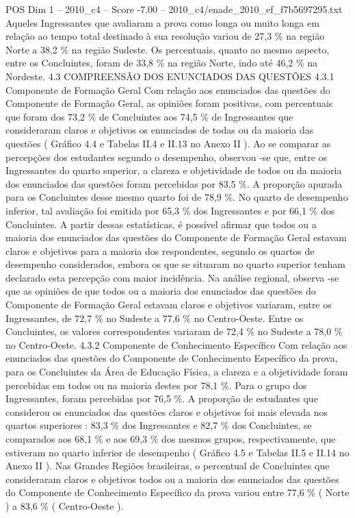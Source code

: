 \begin{textsample}{POS Dim 1 – 2010\_c4 – Score -7.00 – 2010\_c4/enade\_2010\_ef\_f7b5697295.txt}
Aqueles Ingressantes que avaliaram a prova como longa ou muito longa em relação ao tempo total destinado à sua resolução variou de 27,3 \% na região Norte a 38,2 \% na região Sudeste.
Os percentuais, quanto ao mesmo aspecto, entre os Concluintes, foram de 33,8 \% na região Norte, indo até 46,2 \% na Nordeste. 4.3 COMPREENSÃO DOS ENUNCIADOS DAS QUESTÕES 4.3.1 Componente de Formação Geral Com relação aos enunciados das questões do Componente de Formação Geral, as opiniões foram positivas, com percentuais que foram dos 73,2 \% de Concluintes aos 74,5 \% de Ingressantes que consideraram claros e objetivos os enunciados de todas ou da maioria das questões ( Gráfico 4.4 e Tabelas II.4 e II.13 no Anexo II ).
Ao se comparar as percepções dos estudantes segundo o desempenho, observou -se que, entre os Ingressantes do quarto superior, a clareza e objetividade de todos ou da maioria dos enunciados das questões foram percebidas por 83,5 \%.
A proporção apurada para os Concluintes desse mesmo quarto foi de 78,9 \%.
No quarto de desempenho inferior, tal avaliação foi emitida por 65,3 \% dos Ingressantes e por 66,1 \% dos Concluintes.
A partir dessas estatísticas, é possível afirmar que todos ou a maioria dos enunciados das questões do Componente de Formação Geral estavam claros e objetivos para a maioria dos respondentes, segundo os quartos de desempenho considerados, embora os que se situaram no quarto superior tenham declarado esta percepção com maior incidência.
Na análise regional, observa -se que as opiniões de que todos ou a maioria dos enunciados das questões do Componente de Formação Geral estavam claros e objetivos variaram, entre os Ingressantes, de 72,7 \% no Sudeste a 77,6 \% no Centro-Oeste.
Entre os Concluintes, os valores correspondentes variaram de 72,4 \% no Sudeste a 78,0 \% no Centro-Oeste. 4.3.2 Componente de Conhecimento Específico Com relação aos enunciados das questões do Componente de Conhecimento Específico da prova, para os Concluintes da Área de Educação Física, a clareza e a objetividade foram percebidas em todos ou na maioria destes por 78,1 \%.
Para o grupo dos Ingressantes, foram percebidas por 76,5 \%.
A proporção de estudantes que considerou os enunciados das questões claros e objetivos foi mais elevada nos quartos superiores : 83,3 \% dos Ingressantes e 82,7 \% dos Concluintes, se comparados aos 68,1 \% e aos 69,3 \% dos mesmos grupos, respectivamente, que estiveram no quarto inferior de desempenho ( Gráfico 4.5 e Tabelas II.5 e II.14 no Anexo II ).
Nas Grandes Regiões brasileiras, o percentual de Concluintes que consideraram claros e objetivos todos ou a maioria dos enunciados das questões do Componente de Conhecimento Específico da prova variou entre 77,6 \% ( Norte ) a 83,6 \% ( Centro-Oeste ).

\end{textsample}
